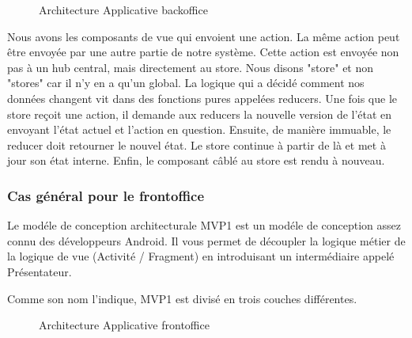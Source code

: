 \begin{figure}[H]
	\caption{\label{fig:my-label} Architecture Applicative backoffice}
\end{figure}

Nous avons les composants de vue qui envoient une action. La m\^eme action peut \^etre envoy\'ee par une autre partie de notre syst\`eme. Cette action est envoy\'ee non pas \`a un hub central, mais directement au store. Nous disons "store" et non "stores" car il n'y en a qu'un global. La logique qui a d\'ecid\'e comment nos donn\'ees changent vit dans des fonctions pures appel\'ees reducers. Une fois que le store re\c{c}oit une action, il demande aux reducers la nouvelle version de l'\'etat en envoyant l'\'etat actuel et l'action en question. Ensuite, de mani\`ere immuable, le reducer doit retourner le nouvel \'etat. Le store continue \`a partir de l\`a et met \`a jour son \'etat interne. Enfin, le composant c\^abl\'e au store est rendu \`a nouveau.


\subsubsection{Cas g\'en\'eral pour le frontoffice}

Le mod\'ele de conception architecturale \gls{MVP1} est un mod\'ele de conception assez connu des d\'eveloppeurs Android. Il vous permet de d\'ecoupler la logique m\'etier de la logique de vue (Activit\'e / Fragment) en introduisant un interm\'ediaire appel\'e Pr\'esentateur.

Comme son nom l'indique, \gls{MVP1} est divis\'e en trois couches diff\'erentes.

\begin{figure}[H]
	\caption{\label{fig:my-label} Architecture Applicative frontoffice}
\end{figure}

